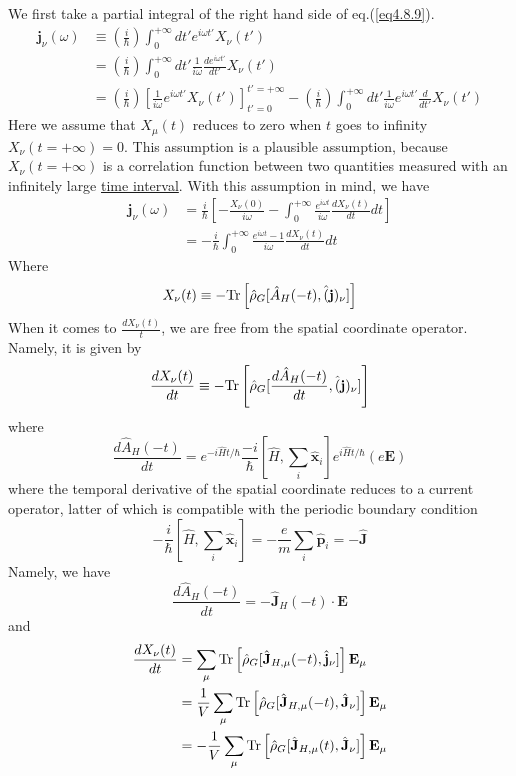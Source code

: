  We first take a partial integral of the right hand side of eq.(\ref{eq4.8.9}).
\[
\begin{aligned}
\mathbf j_\nu (\omega)& \equiv \left(\frac{i}{\hbar}\right) \int_{0}^{+\infty} dt' e^{i\omega t'} X_\nu(t')\\
&=\left(\frac{i}{\hbar}\right) \int_{0}^{+\infty} dt' \frac{1}{i\omega} \frac{d e^{i\omega t'}}{dt'} X_\nu(t')\\
&=\left(\frac{i}{\hbar}\right)  \left[ \frac{1}{i\omega}  e^{i\omega t'} X_\nu(t')\right]_{t'=0}^{t'=+\infty}-\left(\frac{i}{\hbar}\right) \int_{0}^{+\infty} dt' \frac{1}{i\omega} e^{i\omega t'} \frac{d}{dt'} X_\nu(t')
\end{aligned}
\]
 Here we assume that $X_\mu(t)$ reduces to zero when $t$ goes to infinity $X_\nu(t=+\infty)=0$.
 This assumption is a plausible assumption, because $X_\nu(t=+\infty)$ is a correlation function between two quantities measured with an infinitely large \uline{time interval}.
With this assumption in mind, we have 
\begin{equation}\label{eq4.8.10}
\begin{aligned}
\mathbf j_\nu(\omega)&=\frac{i}{\hbar}\left[ -\frac{X_\nu(0)}{i\omega}-\int _0^{+\infty}  \frac{e^{i\omega t}}{i\omega} \frac{dX_\nu(t)}{dt} dt   \right]\\
&=-\frac{i}{\hbar} \int _0^{+\infty} \frac{e^{i\omega t }-1}{i\omega} \frac{dX_\nu(t)}{dt} dt  
\end{aligned}
\end{equation}
 Where
\[
X_\nu(t)\equiv - \text{Tr}\left[\hat \rho_G [\hat A_H(-t),\hat(\mathbf{j})_\nu]\right]
\]
 When it comes to $\frac{dX_\nu(t)}{t}$, we are free from the spatial coordinate operator.
 Namely, it is given by
\[
\frac{dX_\nu(t)}{dt}\equiv - \text{Tr}\left[\hat \rho_G [\frac{d\hat A_H(-t)}{dt},\hat(\mathbf{j})_\nu]\right]
\]
where
\[
\frac{d\hat A_H(-t)}{dt}=e^{-i \hat H t/\hbar}\frac{-i}{\hbar}[\hat  H,\sum_i \hat{\mathbf{x}}_i] e^{i \hat H t/\hbar} (e\mathbf E)
\]
where the temporal derivative of the spatial coordinate reduces to a current operator, latter of which is compatible with the periodic boundary condition
\begin{equation}
-\frac{i}{\hbar}[\hat  H,\sum_i \hat{\mathbf{x}}_i]=-\frac{e}{m}\sum_i\hat {\mathbf{p}}_i=-\hat{\mathbf{J}}
\end{equation}
 Namely, we have
\[
\frac{d\hat A_H(-t)}{dt}=-\hat{\mathbf{J}}_H(-t)\cdot \mathbf{E}
\]
and 
\begin{equation}
\begin{aligned}
\frac{dX_\nu(t)}{dt}&=\sum_\mu \text{Tr} \left[\hat \rho_G[\hat{\mathbf{J}}_{H,\mu}(-t),\hat{\mathbf j}_\nu]\right] \mathbf{E}_\mu\\
&=\frac{1}{V}\sum_\mu \text{Tr} \left[\hat \rho_G[\hat{\mathbf{J}}_{H,\mu}(-t),\hat{\mathbf J}_\nu]\right] \mathbf{E}_\mu\\
&=-\frac{1}{V}\sum_\mu \text{Tr} \left[\hat \rho_G[\hat{\mathbf{J}}_{H,\mu}(t),\hat{\mathbf J}_\nu]\right] \mathbf{E}_\mu
\end{aligned}
\end{equation}
